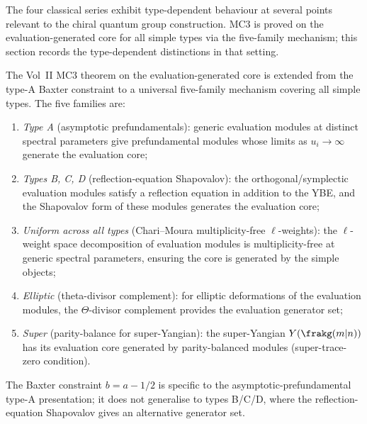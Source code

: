 The four classical series exhibit type-dependent behaviour at
several points relevant to the chiral quantum group construction.
MC3 is proved on the evaluation-generated core for all simple
types via the five-family mechanism; this section records the
type-dependent distinctions in that setting.

\begin{proposition}
\label{prop:mc3-five-family-types}
The Vol~II MC3 theorem on the evaluation-generated core is
extended from the type-A Baxter
constraint to a universal five-family mechanism covering all
simple types. The five families are:
\begin{enumerate}[label=(\roman*)]
 \item \emph{Type A} (asymptotic prefundamentals): generic
 evaluation modules at distinct spectral parameters give
 prefundamental modules whose limits as
 $u_i \to \infty$ generate the evaluation core;
 \item \emph{Types B, C, D} (reflection-equation Shapovalov):
 the orthogonal/symplectic evaluation modules satisfy a
 reflection equation in addition to the YBE, and the
 Shapovalov form of these modules generates the evaluation
 core;
 \item \emph{Uniform across all types} (Chari--Moura
 multiplicity-free $\ell$-weights): the
 $\ell$-weight space decomposition of evaluation modules is
 multiplicity-free at generic spectral parameters, ensuring
 the core is generated by the simple objects;
 \item \emph{Elliptic} (theta-divisor complement): for
 elliptic deformations of the evaluation modules, the
 $\Theta$-divisor complement provides the evaluation generator
 set;
 \item \emph{Super} (parity-balance for super-Yangian): the
 super-Yangian $Y(\frakg(m|n))$ has its evaluation core
 generated by parity-balanced modules
 (super-trace-zero condition).
\end{enumerate}
The Baxter constraint $b = a - 1/2$ is specific to
the asymptotic-prefundamental type-A presentation; it does not generalise
to types B/C/D, where the reflection-equation Shapovalov gives
an alternative generator set.
\end{proposition}

